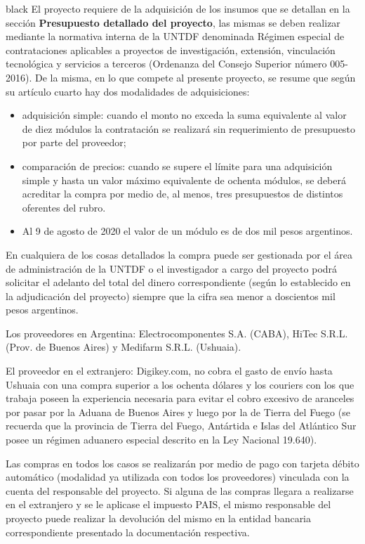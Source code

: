 \documentclass[11pt]{charter}
\begin{document}
\begin{consigna}{black}
El proyecto requiere de la adquisición de los insumos que se detallan en la sección \textbf{Presupuesto detallado del proyecto}, las mismas se deben realizar mediante la normativa interna de la UNTDF denominada Régimen especial de contrataciones aplicables a proyectos de investigación, extensión, vinculación tecnológica y servicios a terceros (Ordenanza del Consejo Superior número 005-2016).
De la misma, en lo que compete al presente proyecto, se resume que según su artículo cuarto hay dos modalidades de adquisiciones:
	\begin{itemize}
	\item adquisición simple: cuando el monto no exceda la suma equivalente al valor de diez módulos la contratación se realizará sin requerimiento de presupuesto por parte del proveedor;
	\item comparación de precios: cuando se supere el límite para una adquisición simple y hasta un valor máximo equivalente de ochenta módulos, se deberá acreditar la compra por medio de, al menos, tres presupuestos de distintos oferentes del rubro.
	\item Al 9 de agosto de 2020 el valor de un módulo es de dos mil pesos argentinos.
	\end{itemize}
En cualquiera de los cosas detallados la compra puede ser gestionada por el área de administración de la UNTDF o el investigador a cargo del proyecto podrá solicitar el adelanto del total del dinero correspondiente (según lo establecido en la adjudicación del proyecto) siempre que la cifra sea menor a doscientos mil pesos argentinos.

Los proveedores en Argentina: Electrocomponentes S.A. (CABA), HiTec S.R.L. (Prov. de Buenos Aires) y Medifarm S.R.L. (Ushuaia).

El proveedor en el extranjero: Digikey.com, no cobra el gasto de envío hasta Ushuaia con una compra superior a los ochenta dólares y los couriers con los que trabaja poseen la experiencia necesaria para evitar el cobro excesivo de aranceles por pasar por la Aduana de Buenos Aires y luego por la de Tierra del Fuego (se recuerda que la provincia de Tierra del Fuego, Antártida e Islas del Atlántico Sur posee un régimen aduanero especial descrito en la Ley Nacional 19.640).

Las compras en todos los casos se realizarán por medio de pago con tarjeta débito automático (modalidad ya utilizada con todos los proveedores) vinculada con la cuenta del responsable del proyecto. Si alguna de las compras llegara a realizarse en el extranjero y se le aplicase el impuesto PAIS, el mismo responsable del proyecto puede realizar la devolución del mismo en la entidad bancaria correspondiente presentado la documentación respectiva.
\end{consigna}
\end{document}
